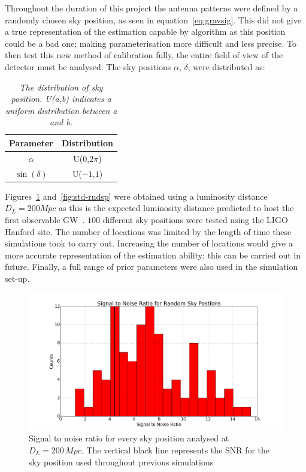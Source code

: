 \documentclass[12pt]{iopart}
\begin{document}
Throughout the duration of this project the antenna patterns were defined by a
randomly chosen sky position, as seen in equation~\ref{eq:gravsig}. This did
not give a true representation of the estimation capable by algorithm as this
position could be a bad one; making parameterisation more difficult and less
precise. To then test this new method of calibration fully, the entire field of
view of the detector must be analysed. The sky positions $\alpha$, $\delta$,
were distributed as: \begin{table}[H] \centering \begin{tabular}{|c|c|} \hline
Parameter & Distribution \\ \hline $\alpha$       & U($0$,$2\pi$) \\
$\sin(\delta)$ & U($-1$,$1$)    \\ \hline \end{tabular} \caption{\textit{The
distribution of sky position. U(a,b) indicates a uniform distribution between a
and b.}} \label{tab:sp} \end{table}

Figures~\ref{fig:snr-rndsp} and~\ref{fig:std-rndsp} were obtained using a
luminosity distance $D_{L} = 200 Mpc$ as this is the expected luminosity
distance predicted to host the first observable GW~\cite{peadvanced}. $100$
different sky positions were tested using the LIGO Hanford site. The number of
locations was limited by the length of time these simulations took to carry
out. Increasing the number of locations would give a more accurate
representation of the estimation ability; this can be carried out in future.
Finally, a full range of prior parameters were also used in the simulation
set-up.

\begin{figure}
  \centering
  \includegraphics[width=\textwidth]{rand_sp_snr_D200}
  \caption{Signal to noise ratio for every sky position analysed at
$D_{L} = 200 \,Mpc$. The vertical black line represents the SNR for the sky
position used throughout previous simulations}
  \label{fig:snr-rndsp}
\end{figure}
\end{document}
